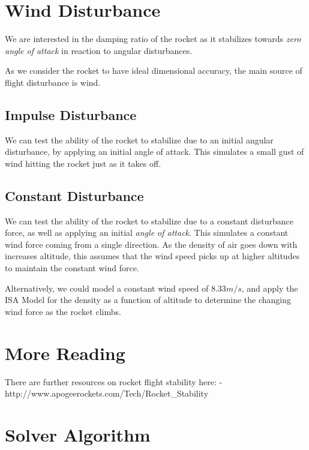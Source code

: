 \documentclass[]{book}
\begin{document}
\section{Wind Disturbance}\label{wind-disturbance}

We are interested in the damping ratio of the rocket as it stabilizes
towards \emph{zero angle of attack} in reaction to angular disturbances.

As we consider the rocket to have ideal dimensional accuracy, the main
source of flight disturbance is wind.

\subsection{Impulse Disturbance}\label{impulse-disturbance}

We can test the ability of the rocket to stabilize due to an initial
angular disturbance, by applying an initial angle of attack. This
simulates a small gust of wind hitting the rocket just as it takes off.

\subsection{Constant Disturbance}\label{constant-disturbance}

We can test the ability of the rocket to stabilize due to a constant
disturbance force, as well as applying an initial \emph{angle of
attack}. This simulates a constant wind force coming from a single
direction. As the density of air goes down with increases altitude, this
assumes that the wind speed picks up at higher altitudes to maintain the
constant wind force.

Alternatively, we could model a constant wind speed of \(8.33 m/s\), and
apply the ISA Model for the density as a function of altitude to
determine the changing wind force as the rocket climbs.

\section{More Reading}\label{more-reading}

There are further resources on rocket flight stability here: -
http://www.apogeerockets.com/Tech/Rocket\_Stability

\section{Solver Algorithm}\label{solver-algorithm}
\end{document}
